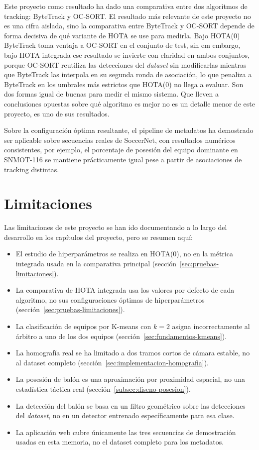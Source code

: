 Este proyecto como resultado ha dado una comparativa entre dos algoritmos de tracking: ByteTrack y OC-SORT. 
El resultado más relevante de este proyecto no es una cifra aislada, sino la comparativa entre ByteTrack y OC-SORT depende
de forma decisiva de qué variante de HOTA se use para medirla.
Bajo HOTA(0)  ByteTrack
toma ventaja a OC-SORT en el conjunto de test, sin em embargo, bajo HOTA integrada ese resultado se
invierte con claridad en ambos conjuntos, porque OC-SORT reutiliza las
detecciones del \emph{dataset} sin modificarlas mientras que ByteTrack las
interpola en su segunda ronda de asociación, lo que penaliza a ByteTrack en
los umbrales más estrictos que HOTA(0) no llega a evaluar. Son dos formas
igual de buenas para medir el mismo sistema. Que lleven a conclusiones
opuestas sobre qué algoritmo es mejor no es un detalle menor de este
proyecto, es uno de sus resultados.

Sobre la configuración óptima resultante, el pipeline de metadatos
ha demostrado ser aplicable sobre
secuencias reales de SoccerNet, con resultados numéricos consistentes,
por ejemplo, el porcentaje de posesión del equipo dominante en
SNMOT-116 se mantiene prácticamente igual pese a partir de
asociaciones de tracking distintas.

\section{Limitaciones}
\label{sec:conclusiones-limitaciones}

Las limitaciones de este proyecto se han ido documentando a lo largo del desarrollo en
los capítulos del proyecto, pero se resumen aquí:

\begin{itemize}
  \item El estudio de hiperparámetros se realiza en HOTA(0), no en
        la métrica integrada usada en la comparativa principal
        (sección~\ref{sec:pruebas-limitaciones}).
  \item La comparativa de HOTA integrada usa los valores por defecto de
        cada algoritmo, no sus configuraciones óptimas de hiperparámetros
        (sección~\ref{sec:pruebas-limitaciones}).
  \item La clasificación de equipos por K-means con $k=2$ asigna
        incorrectamente al árbitro a uno de los dos equipos
        (sección~\ref{sec:fundamentos-kmeans}).
  \item La homografía real se ha limitado a dos tramos cortos de cámara
        estable, no al dataset completo
        (sección~\ref{sec:implementacion-homografia}).
  \item La posesión de balón es una aproximación por proximidad espacial,
        no una estadística táctica real
        (sección~\ref{subsec:diseno-posesion}).
  \item La detección del balón se basa en un filtro geométrico sobre las
        detecciones del \emph{dataset}, no en un detector entrenado
        específicamente para esa clase.
  \item La aplicación web cubre únicamente las tres secuencias de
        demostración usadas en esta memoria, no el dataset completo para los metadatos.
\end{itemize}


